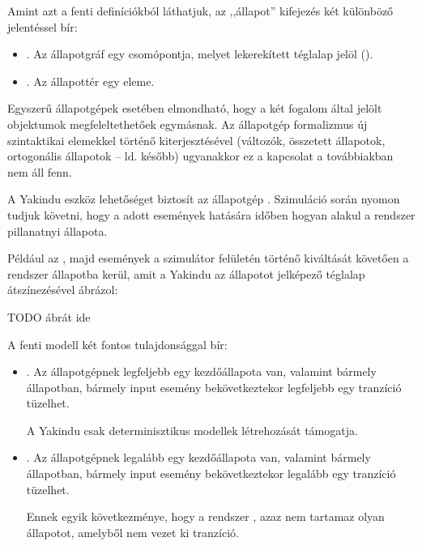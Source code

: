 Amint azt a fenti definíciókból láthatjuk, az ,,állapot'' kifejezés két különböző jelentéssel bír:

\begin{itemize}
	\item {}. Az állapotgráf egy csomópontja, melyet lekerekített téglalap jelöl ().
	\item {}. Az állapottér egy eleme.
\end{itemize}

Egyszerű állapotgépek esetében elmondható, hogy a két fogalom által jelölt objektumok megfeleltethetőek egymásnak. Az állapotgép formalizmus új szintaktikai elemekkel történő kiterjesztésével (változók, összetett állapotok, ortogonális állapotok -- ld. később) ugyanakkor ez a kapcsolat a továbbiakban nem áll fenn.

\begin{tipp}
A Yakindu eszköz lehetőséget biztosít az állapotgép . Szimuláció során nyomon tudjuk követni, hogy a adott események hatására időben hogyan alakul a rendszer pillanatnyi állapota.

Például az , majd  események a szimulátor felületén történő kiváltását követően a rendszer  állapotba kerül, amit a Yakindu az állapotot jelképező téglalap átszínezésével ábrázol:

TODO ábrát ide
\end{tipp}
 

A fenti modell két fontos tulajdonsággal bír:

\begin{itemize}
	\item {}. Az állapotgépnek legfeljebb egy kezdőállapota van, valamint bármely állapotban, bármely input esemény bekövetkeztekor legfeljebb egy tranzíció tüzelhet.

	\begin{megjegyzes}
		A Yakindu csak determinisztikus modellek létrehozását támogatja.
	\end{megjegyzes}

	\item {}. Az állapotgépnek legalább egy kezdőállapota van, valamint bármely állapotban, bármely input esemény bekövetkeztekor legalább egy tranzíció tüzelhet.

	\begin{megjegyzes}
		Ennek egyik következménye, hogy a rendszer , azaz nem tartamaz olyan állapotot, amelyből nem vezet ki tranzíció.
	\end{megjegyzes}
	
\end{itemize}


